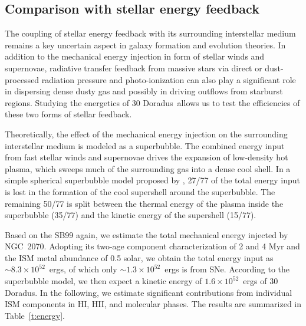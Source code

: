 \documentclass[usenatbib]{mnras}
\def\xs{30 Doradus}
\begin{document}
\subsection{Comparison with stellar energy feedback}

The coupling of  stellar energy feedback with its surrounding interstellar medium remains a key uncertain aspect in galaxy formation and evolution theories. In addition to the mechanical energy injection in form of stellar winds and supernovae, radiative transfer feedback from massive stars via direct or dust-processed radiation pressure and photo-ionization can also play a significant role in dispersing dense dusty gas and possibly in driving outflows from starburst regions. Studying the energetics of \xs\ allows us to test the efficiencies of these two forms of stellar feedback.

Theoretically, the effect of the mechanical energy injection on the surrounding interstellar medium is modeled as a superbubble. The combined energy input from fast stellar winds and supernovae drives the expansion of low-density hot plasma, which sweeps much of the surrounding gas into a dense cool shell. In a simple spherical superbubble model proposed by \citet{Mac}, 27/77 of the total energy input is lost in the formation of the cool supershell around the superbubble. The remaining 50/77 is split between the thermal energy of the plasma inside the superbubble (35/77) and the kinetic energy of the supershell (15/77). 

Based on the SB99 again, we estimate the total mechanical energy injected by NGC~2070. Adopting its two-age component characterization of 2 and 4 Myr and the ISM metal abundance of 0.5 solar, we obtain the total energy input as $\sim 8.3 \times 10^{52}$~ergs, of which only $\sim 1.3 \times 10^{52}$~ergs is from SNe. According to the superbubble model, we then expect a kinetic energy of $1.6 \times 10^{52}$~ergs of \xs. In the following, we estimate significant contributions from individual ISM components in HI, HII, and molecular phases. The results are summarized in Table~\ref{t:energy}.
\end{document}
